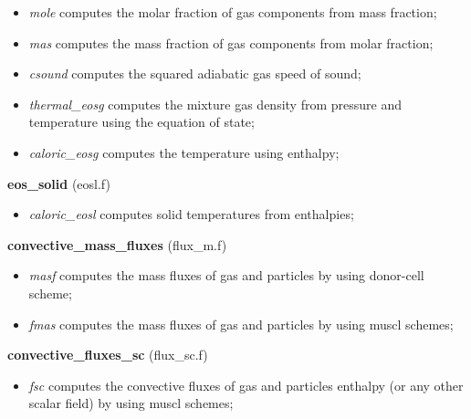 \begin{itemize}
\item {\em mole} computes the molar fraction of gas components from mass fraction;\\
\item {\em mas} computes the mass fraction of gas components from molar fraction;\\
\item {\em csound} computes the squared adiabatic gas speed of sound;\\
\item  {\em thermal\_eosg} computes the mixture gas density from pressure and temperature 
using the equation of state;\\
\item  {\em caloric\_eosg} computes the temperature using enthalpy;
\end{itemize}
%
%
{\large{\bf eos\_solid}} (eosl.f)\\
\begin{itemize}
\item {\em caloric\_eosl} computes solid temperatures from enthalpies;\\
\end{itemize}
%
%
{\large{\bf convective\_mass\_fluxes}} (flux\_m.f)\\
\begin{itemize}
\item {\em masf} computes the mass fluxes of gas and particles by using donor-cell scheme;\\
\item {\em fmas} computes the mass fluxes of gas and particles by using muscl schemes;\\
\end{itemize}
%
%
{\large{\bf convective\_fluxes\_sc}} (flux\_sc.f)\\
\begin{itemize}
\item {\em fsc} computes the convective fluxes of gas and particles enthalpy (or any other scalar field)
 by using muscl schemes;\\
\end{itemize}
%

